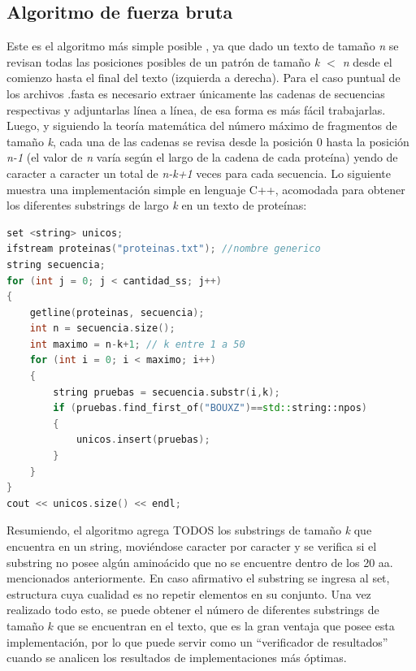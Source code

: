 \subsection{Algoritmo de fuerza bruta}

Este es el algoritmo más simple posible \cite{fuerzabruta}, ya que dado un texto de tamaño \textit{n} se revisan todas las posiciones posibles de un patrón de tamaño \textit{k $<$ n} desde el comienzo hasta el final del texto (izquierda a derecha). Para el caso puntual de los archivos .fasta es necesario extraer únicamente las cadenas de secuencias respectivas y adjuntarlas línea a línea, de esa forma es más fácil trabajarlas. Luego, y siguiendo la teoría matemática del número máximo de fragmentos de tamaño \textit{k}, cada una de las cadenas se revisa desde la posición 0 hasta la posición \textit{n-1} (el valor de \textit{n} varía según el largo de la cadena de cada proteína) yendo de caracter a caracter un total de \textit{n-k+1} veces para cada secuencia. Lo siguiente muestra una implementación simple en lenguaje C++, acomodada para obtener los diferentes substrings de largo \textit{k} en un texto de proteínas:
\\
\begin{lstlisting}[language=C++, caption=Búsqueda utilizando fuerza bruta en C++.]
set <string> unicos;
ifstream proteinas("proteinas.txt"); //nombre generico
string secuencia;
for (int j = 0; j < cantidad_ss; j++)
{
    getline(proteinas, secuencia);
    int n = secuencia.size();
    int maximo = n-k+1; // k entre 1 a 50
    for (int i = 0; i < maximo; i++)
    {
        string pruebas = secuencia.substr(i,k);
        if (pruebas.find_first_of("BOUXZ")==std::string::npos)
        {
            unicos.insert(pruebas);
        }
    }
}
cout << unicos.size() << endl;
\end{lstlisting}

Resumiendo, el algoritmo agrega TODOS los substrings de tamaño \textit{k} que encuentra en un string, moviéndose caracter por caracter y se verifica si el substring no posee algún aminoácido que no se encuentre dentro de los 20 aa. mencionados anteriormente. En caso afirmativo el substring se ingresa al set, estructura cuya cualidad es no repetir elementos en su conjunto. Una vez realizado todo esto, se puede obtener el número de diferentes substrings de tamaño $k$ que se encuentran en el texto, que es la gran ventaja que posee esta implementación, por lo que puede servir como un ``verificador de resultados'' cuando se analicen los resultados de implementaciones más óptimas.

